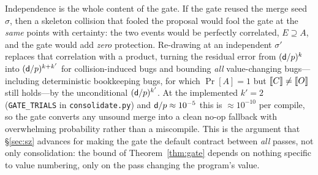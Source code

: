 \documentclass[sigplan,10pt,review]{acmart}
\begin{document}
\begin{remark}
Independence is the whole content of the gate. If the gate reused the
merge seed $\sigma$, then a skeleton collision that fooled the proposal
would fool the gate at the \emph{same} points with certainty: the two
events would be perfectly correlated, $E\supseteq A$, and the gate would
add \emph{zero} protection. Re-drawing at an independent $\sigma'$
replaces that correlation with a product, turning the residual error from
$(\mathsf{d}/p)^{k}$ into $(\mathsf{d}/p)^{k+k'}$ for collision-induced bugs and
bounding \emph{all} value-changing bugs---including deterministic
bookkeeping bugs, for which $\Pr[A]=1$ but $\left[\!\left[C\right]\!\right]\neq\left[\!\left[O\right]\!\right]$ still
holds---by the unconditional $(\mathsf{d}/p)^{k'}$. At the implemented $k'=2$ (\texttt{GATE\_TRIALS} in
\texttt{consolidate.py}) and $\mathsf{d}/p\approx10^{-5}$ this is
$\approx10^{-10}$ per compile, so the gate
converts any unsound merge into a clean no-op fallback with overwhelming
probability rather than a miscompile. This is the argument that
\S\ref{sec:sz} advances for making the gate the default contract between
\emph{all} passes, not only consolidation: the bound of
Theorem~\ref{thm:gate} depends on nothing specific to value numbering,
only on the pass changing the program's value.
\end{remark}
\end{document}
